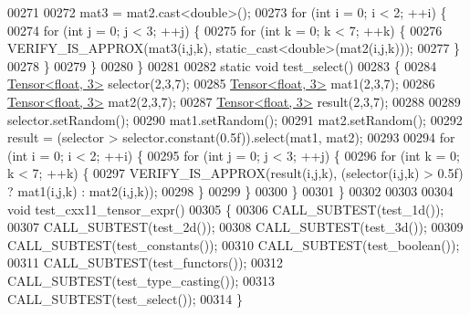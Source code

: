 \begin{DoxyCode}
00271 
00272   mat3 = mat2.cast<\textcolor{keywordtype}{double}>();
00273   \textcolor{keywordflow}{for} (\textcolor{keywordtype}{int} i = 0; i < 2; ++i) \{
00274     \textcolor{keywordflow}{for} (\textcolor{keywordtype}{int} j = 0; j < 3; ++j) \{
00275       \textcolor{keywordflow}{for} (\textcolor{keywordtype}{int} k = 0; k < 7; ++k) \{
00276         VERIFY\_IS\_APPROX(mat3(i,j,k), static\_cast<double>(mat2(i,j,k)));
00277       \}
00278     \}
00279   \}
00280 \}
00281 
00282 \textcolor{keyword}{static} \textcolor{keywordtype}{void} test\_select()
00283 \{
00284   \hyperlink{class_eigen_1_1_tensor}{Tensor<float, 3>} selector(2,3,7);
00285   \hyperlink{class_eigen_1_1_tensor}{Tensor<float, 3>} mat1(2,3,7);
00286   \hyperlink{class_eigen_1_1_tensor}{Tensor<float, 3>} mat2(2,3,7);
00287   \hyperlink{class_eigen_1_1_tensor}{Tensor<float, 3>} result(2,3,7);
00288 
00289   selector.setRandom();
00290   mat1.setRandom();
00291   mat2.setRandom();
00292   result = (selector > selector.constant(0.5f)).select(mat1, mat2);
00293 
00294   \textcolor{keywordflow}{for} (\textcolor{keywordtype}{int} i = 0; i < 2; ++i) \{
00295     \textcolor{keywordflow}{for} (\textcolor{keywordtype}{int} j = 0; j < 3; ++j) \{
00296       \textcolor{keywordflow}{for} (\textcolor{keywordtype}{int} k = 0; k < 7; ++k) \{
00297         VERIFY\_IS\_APPROX(result(i,j,k), (selector(i,j,k) > 0.5f) ? mat1(i,j,k) : mat2(i,j,k));
00298       \}
00299     \}
00300   \}
00301 \}
00302 
00303 
00304 \textcolor{keywordtype}{void} test\_cxx11\_tensor\_expr()
00305 \{
00306   CALL\_SUBTEST(test\_1d());
00307   CALL\_SUBTEST(test\_2d());
00308   CALL\_SUBTEST(test\_3d());
00309   CALL\_SUBTEST(test\_constants());
00310   CALL\_SUBTEST(test\_boolean());
00311   CALL\_SUBTEST(test\_functors());
00312   CALL\_SUBTEST(test\_type\_casting());
00313   CALL\_SUBTEST(test\_select());
00314 \}
\end{DoxyCode}
